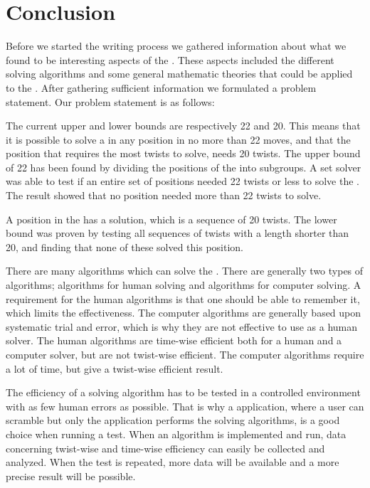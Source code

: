 \chapter{Conclusion}

Before we started the writing process we gathered information about what we found to be interesting aspects of the \rubik{}. 
These aspects included the different solving algorithms and some general mathematic theories that could be applied to the \rubik{}.
After gathering sufficient information we formulated a problem statement. Our problem statement is as follows:


\linebreak

The current upper and lower bounds are respectively 22 and 20. 
This means that it is possible to solve a \rubik{} in any position in no more than 22 moves, and that the \rubik{} position that requires the most twists to solve, needs 20 twists.
The upper bound of 22 has been found by dividing the positions of the \rubik{} into subgroups. A set solver was able to test if an entire set of positions needed 22 twists or less to solve the \rubik{}. The result showed that no \rubik{} position needed more than 22 twists to solve.

A position in the \rubik{} has a solution, which is a sequence of 20 twists. The lower bound was proven by testing all sequences of twists with a length shorter than 20, and finding that none of these solved this position.

There are many algorithms which can solve the \rubik{}. 
There are generally two types of algorithms; algorithms for human solving and algorithms for computer solving. 
A requirement for the human algorithms is that one should be able to remember it, which limits the effectiveness. 
The computer algorithms are generally based upon systematic trial and error, which is why they are not effective to use as a human solver.
The human algorithms are time-wise efficient both for a human and a computer solver, but are not twist-wise efficient.
The computer algorithms require a lot of time, but give a twist-wise efficient result.

The efficiency of a solving algorithm has to be tested in a controlled environment with as few human errors as possible. 
That is why a application, where a user can scramble but only the application performs the solving algorithms, is a good choice when running a test.
When an algorithm is implemented and run, data concerning twist-wise and time-wise efficiency can easily be collected and analyzed. 
When the test is repeated, more data will be available and a more precise result will be possible.

